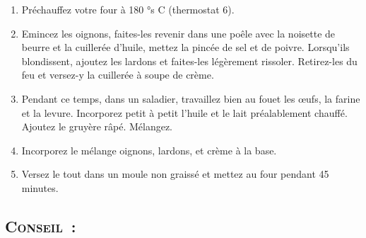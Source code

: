 \begin{enumerate}
\item Préchauffez votre four à 180 °s C (thermostat 6).  

\item Emincez les oignons, faites-les revenir dans une poêle avec la noisette de beurre et la cuillerée d’huile, mettez la pincée de sel et de poivre. Lorsqu’ils blondissent, ajoutez les lardons et faites-les légèrement rissoler. Retirez-les du feu et versez-y la cuillerée à soupe de crème.

\item Pendant ce temps, dans un saladier, travaillez bien au fouet les œufs, la farine et la levure. Incorporez petit à petit l’huile et le lait préalablement chauffé. Ajoutez le gruyère râpé. Mélangez.

\item Incorporez le mélange oignons, lardons, et crème à la base.

\item Versez le tout dans un moule non graissé et mettez au four pendant 45 minutes.
\end{enumerate}


\subsection*{\textsc{Conseil~:}}


